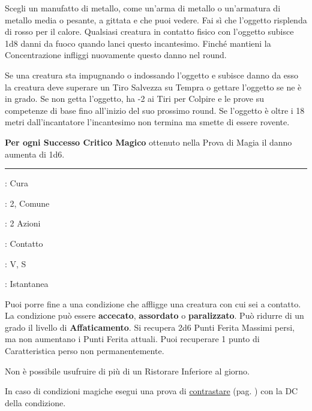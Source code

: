 \begin{multicols}{2}
Scegli un manufatto di metallo, come un'arma di metallo o un'armatura di metallo media o pesante, a gittata e che puoi vedere. Fai sì che l'oggetto risplenda di rosso per il calore. Qualsiasi creatura in contatto fisico con l'oggetto subisce 1d8 danni da fuoco quando lanci questo incantesimo. Finché mantieni la Concentrazione infliggi nuovamente questo danno nel round.

Se una creatura sta impugnando o indossando l'oggetto e subisce danno da esso la creatura deve superare un Tiro Salvezza su Tempra o gettare l'oggetto se ne è in grado. Se non getta l'oggetto, ha -2 ai Tiri per Colpire e le prove su competenze di base fino all'inizio del suo prossimo round. Se l'oggetto è oltre i 18 metri dall'incantatore l'incantesimo non termina ma smette di essere rovente.

\textbf{Per ogni Successo Critico Magico} ottenuto nella Prova di Magia il danno aumenta di 1d6.

\smallskip\noindent\rule{\linewidth}{2pt} \hypertarget{Ristorare Inferiore}{}\smallskip{}
\noindent
\begin{description}[noitemsep, topsep=0pt, parsep=0pt, partopsep=0pt, leftmargin=0cm, labelwidth=2.8cm]
	\item[\textbf{Lista di Magia}]: Cura
	\item[\textbf{Livello}]: 2, Comune
	\item[\textbf{T. di Lancio}]: 2 Azioni
	\item[\textbf{Gittata}]: Contatto
	\item[\textbf{Componenti}]: V, S
	\item[\textbf{Durata}]: Istantanea
\end{description}

Puoi porre fine a una condizione che affligge una creatura con cui sei a contatto. La condizione può essere \textbf{accecato}, \textbf{assordato} o \textbf{paralizzato}. Può ridurre di un grado il livello di \textbf{Affaticamento}. Si recupera 2d6 Punti Ferita Massimi persi, ma non aumentano i Punti Ferita attuali. Puoi recuperare 1 punto di Caratteristica perso non permanentemente.

Non è possibile usufruire di più di un Ristorare Inferiore al giorno.

In caso di condizioni magiche esegui una prova di \hyperlink{contrastareincantesimi}{contrastare} (pag. \pageref{contrastareincantesimi}) con la DC della condizione.


\end{multicols}
